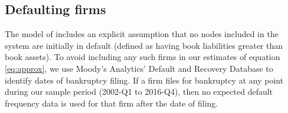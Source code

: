 

\subsection{Defaulting firms}

The model of \citet{glasserman2015likely} includes an explicit assumption that no nodes included in the system are initially in default (defined as having book liabilities greater than book assets). To avoid including any such firms in our estimates of equation \ref{eq:approx}, we use Moody's Analytics' Default and Recovery Database to identify dates of bankruptcy filing. If a firm files for bankruptcy at any point during our sample period (2002-Q1 to 2016-Q4), then no expected default frequency data is used for that firm after the date of filing.